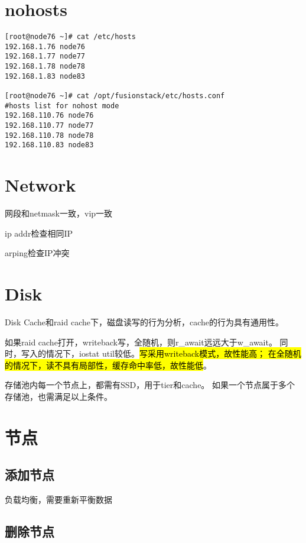 \section{nohosts}

\begin{lstlisting}[frame=single]
[root@node76 ~]# cat /etc/hosts
192.168.1.76 node76
192.168.1.77 node77
192.168.1.78 node78
192.168.1.83 node83

[root@node76 ~]# cat /opt/fusionstack/etc/hosts.conf 
#hosts list for nohost mode
192.168.110.76 node76
192.168.110.77 node77
192.168.110.78 node78
192.168.110.83 node83
\end{lstlisting}

\section{Network}

网段和netmask一致，vip一致

ip addr检查相同IP

arping检查IP冲突 

\section{Disk}

Disk Cache和raid cache下，磁盘读写的行为分析，cache的行为具有通用性。

如果raid cache打开，writeback写，全随机，则r\_await远远大于w\_await。
同时，写入的情况下，iostat util较低。\hl{写采用writeback模式，故性能高；
在全随机的情况下，读不具有局部性，缓存命中率低，故性能低}。

\begin{tcolorbox}
存储池内每一个节点上，都需有SSD，用于tier和cache。
如果一个节点属于多个存储池，也需满足以上条件。
\end{tcolorbox}

\section{节点}

\subsection{添加节点}

负载均衡，需要重新平衡数据

\subsection{删除节点}

